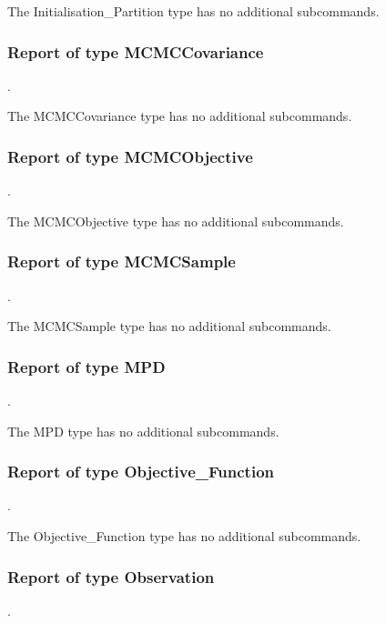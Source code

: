The Initialisation\_Partition type has no additional subcommands.
\subsubsection{Report of type MCMCCovariance}
.
\label{syntax:Report-MCMCCovariance}

The MCMCCovariance type has no additional subcommands.
\subsubsection{Report of type MCMCObjective}
.
\label{syntax:Report-MCMCObjective}

The MCMCObjective type has no additional subcommands.
\subsubsection{Report of type MCMCSample}
.
\label{syntax:Report-MCMCSample}

The MCMCSample type has no additional subcommands.
\subsubsection{Report of type MPD}
.
\label{syntax:Report-MPD}

The MPD type has no additional subcommands.
\subsubsection{Report of type Objective\_Function}
.
\label{syntax:Report-ObjectiveFunction}

The Objective\_Function type has no additional subcommands.
\subsubsection{Report of type Observation}
.
\label{syntax:Report-Observation}


